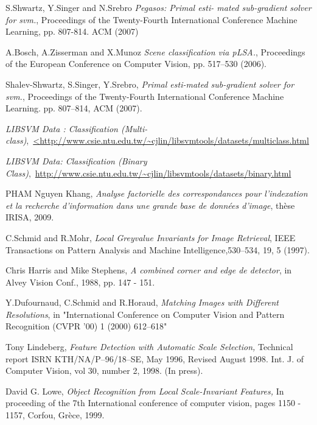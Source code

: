 \cleardoublepage
{}
{}
\begin{thebibliography}{99}

 S.Shwartz, Y.Singer and N.Srebro \emph{ Pegasos: Primal esti-
mated sub-gradient solver for svm.}, Proceedings of the Twenty-Fourth International Conference Machine Learning, pp. 807-814. ACM (2007)

 A.Bosch, A.Zisserman and X.Munoz \emph{Scene
classification via pLSA.}, Proceedings of the European Conference on Computer Vision, pp. 517–530 (2006).

 Shalev-Shwartz, S.Singer, Y.Srebro, \emph{Primal esti-mated sub-gradient solver for svm.}, Proceedings of the Twenty-Fourth International Conference Machine Learning. pp. 807–814, ACM (2007).

\emph{LIBSVM Data : Classification (Multi-class)},\ \url{<http://www.csie.ntu.edu.tw/~cjlin/libsvmtools/datasets/multiclass.html}

\emph{LIBSVM Data: Classification (Binary Class)},\ \url{http://www.csie.ntu.edu.tw/~cjlin/libsvmtools/datasets/binary.html}

 PHAM Nguyen Khang, \emph{Analyse factorielle des correspondances pour l'indexation et la recherche d'information dans une grande base de données d'image}, thèse IRISA, 2009.

 C.Schmid and R.Mohr, \emph{Local Greyvalue Invariants for Image Retrieval}, IEEE Transactions on Pattern Analysis and Machine Intelligence,530--534, 19, 5 (1997).

 Chris Harris and Mike Stephens, \emph{A combined corner and edge de detector},  in Alvey Vision Conf., 1988, pp. 147 - 151.

 Y.Dufournaud, C.Schmid and R.Horaud, \emph{Matching Images with Different Resolutions}, in "International Conference on Computer Vision and Pattern Recognition (CVPR '00) 1 (2000) 612--618"

 Tony Lindeberg, \emph{Feature Detection with Automatic Scale Selection,} Technical report ISRN KTH/NA/P–96/18–SE, May 1996, Revised August 1998. Int. J. of Computer Vision, vol 30, number 2, 1998. (In press).


 David G. Lowe, \emph{Object Recognition from Local Scale-Invariant Features,} In proceeding of the 7th International conference of computer vision, pages 1150 - 1157, Corfou, Grèce, 1999.


\end{thebibliography}
